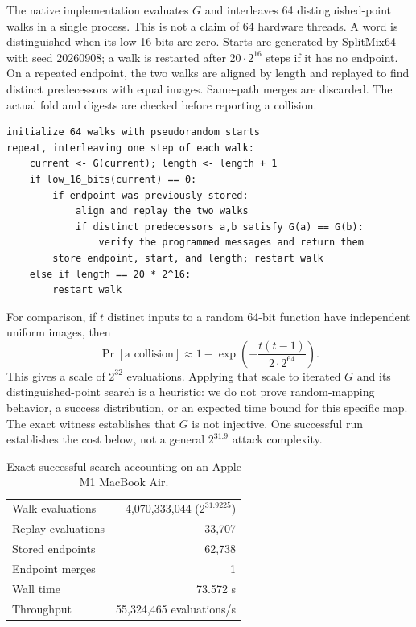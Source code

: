 \documentclass[10pt]{article}
\theoremstyle{definition}
\begin{document}
The native implementation evaluates $G$ and interleaves 64 distinguished-point walks in a single process. This is not a claim of 64 hardware threads. A word is distinguished when its low 16 bits are zero. Starts are generated by SplitMix64 with seed 20260908; a walk is restarted after $20\cdot2^{16}$ steps if it has no endpoint. On a repeated endpoint, the two walks are aligned by length and replayed to find distinct predecessors with equal images. Same-path merges are discarded. The actual fold and digests are checked before reporting a collision.

\begin{lstlisting}[style=code,caption={Collision-search outline; all steps evaluate the defined map G.}]
initialize 64 walks with pseudorandom starts
repeat, interleaving one step of each walk:
    current <- G(current); length <- length + 1
    if low_16_bits(current) == 0:
        if endpoint was previously stored:
            align and replay the two walks
            if distinct predecessors a,b satisfy G(a) == G(b):
                verify the programmed messages and return them
        store endpoint, start, and length; restart walk
    else if length == 20 * 2^16:
        restart walk
\end{lstlisting}

For comparison, if $t$ distinct inputs to a random 64-bit function have independent uniform images, then
\[
\Pr[\text{a collision}]\approx1-\exp\left(-\frac{t(t-1)}{2\cdot2^{64}}\right).
\]
This gives a scale of $2^{32}$ evaluations. Applying that scale to iterated $G$ and its distinguished-point search is a heuristic: we do not prove random-mapping behavior, a success distribution, or an expected time bound for this specific map. The exact witness establishes that $G$ is not injective. One successful run establishes the cost below, not a general $2^{31.9}$ attack complexity.

\begin{table}[ht]
\centering
\caption{Exact successful-search accounting on an Apple M1 MacBook Air.}
\begin{tabular}{@{}lr@{}}
\toprule
Walk evaluations & 4,070,333,044 ($2^{31.9225}$) \\
Replay evaluations & 33,707 \\
Stored endpoints & 62,738 \\
Endpoint merges & 1 \\
Wall time & 73.572 s \\
Throughput & 55,324,465 evaluations/s \\
\bottomrule
\end{tabular}
\end{table}
\end{document}
